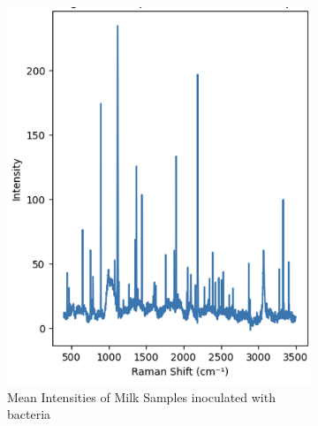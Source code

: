 \begin{figure}[htbp]
  \centering
  \begin{subfigure}[b]{0.32\textwidth}
    \centering
    \includegraphics[width=\linewidth]{Figures/bacteria.png}
    \caption{Mean Intensities of Milk Samples inoculated with bacteria}
    \label{fig:bacteria}
  \end{subfigure}
  \hfill
  \begin{subfigure}[b]{0.32\textwidth}
    \centering

\end{subfigure}
\end{figure}

